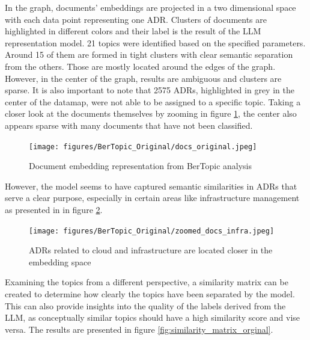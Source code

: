         In the graph, documents' embeddings are projected in a two dimensional space with each data point representing one ADR. Clusters of documents are highlighted in different colors and their label is the result of the LLM representation model. 21 topics were identified based on the specified parameters. Around 15 of them are formed in tight clusters with clear semantic separation from the others. Those are mostly located around the edges of the graph. However, in the center of the graph, results are ambiguous and clusters are sparse. It is also important to note that 2575 ADRs, highlighted in grey in the center of the datamap, were not able to be assigned to a specific topic. Taking a closer look at the documents themselves by zooming in figure \ref{fig:docs_original}, the center also appears sparse with many documents that have not been classified. 
        
        \begin{figure}[h]
            \centering
            \texttt{[image: figures/BerTopic\_Original/docs\_original.jpeg]}
            \caption{Document embedding representation from BerTopic analysis}
            \label{fig:docs_original}
        \end{figure}
        
        However, the model seems to have captured semantic similarities in ADRs that serve a clear purpose, especially in certain areas like infrastructure management as presented in in figure \ref{fig:infra_docs}.

        \begin{figure}[h]
            \centering
            \texttt{[image: figures/BerTopic\_Original/zoomed\_docs\_infra.jpeg]}
            \caption{ADRs related to cloud and infrastructure are located  closer in the embedding space}
            \label{fig:infra_docs}
        \end{figure}
        
        Examining the topics from a different perspective, a similarity matrix can be created to determine how clearly the topics have been separated by the model. This can also provide insights into the quality of the labels derived from the LLM, as conceptually similar topics should have a high similarity score and vise versa. The results are presented in figure \ref{fig:similarity_matrix_orginal}. 
        
